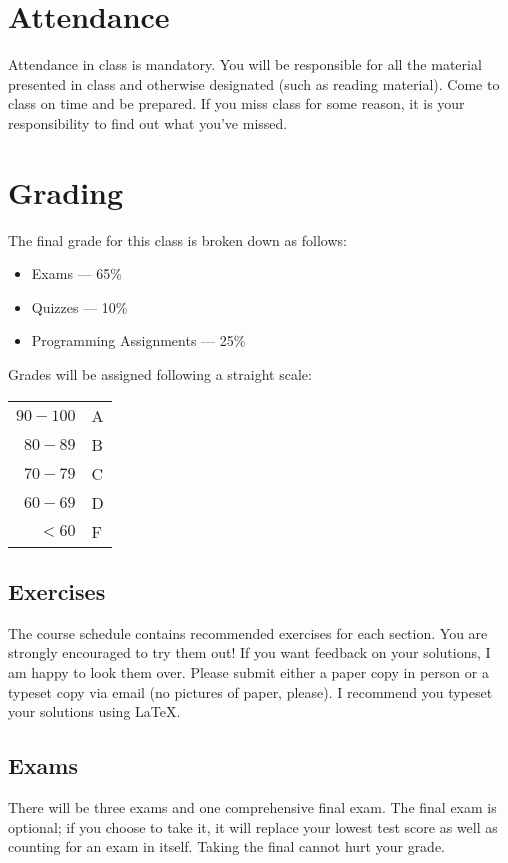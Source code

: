 \documentclass{article}
\begin{document}
\section{Attendance}
Attendance in class is mandatory.
You will be responsible for all the material presented in class and otherwise designated (such as reading material).
Come to class on time and be prepared.
If you miss class for some reason, it is your responsibility to find out what you've missed.

\section{Grading}

The final grade for this class is broken down as follows:

\begin{itemize}
	\item Exams --- 65\%
	\item Quizzes --- 10\% 
	\item Programming Assignments --- 25\%
\end{itemize}

Grades will be assigned following a straight scale:

\begin{tabular}{r|l}
	$90-100$ & A \\
	$80-89$ & B \\
	$70-79$ & C \\
	$60-69$ & D \\
	$< 60$ & F
\end{tabular}

\subsection{Exercises}
The course schedule contains recommended exercises for each section.
You are strongly encouraged to try them out!
If you want feedback on your solutions, I am happy to look them over.
Please submit either a paper copy in person or a typeset copy via email (no pictures of paper, please).
I recommend you typeset your solutions using \LaTeX{}.

\subsection{Exams}
There will be three exams and one comprehensive final exam.
The final exam is optional; if you choose to take it, it will replace your lowest test score as well as counting for an exam in itself.
Taking the final cannot hurt your grade.
\end{document}
